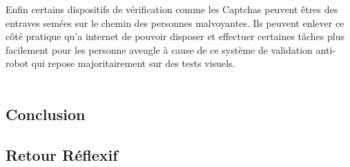 \documentclass{article}
\begin{document}
Enfin certains dispositifs de vérification comme les Captchas \cite{Wagner_2022b} peuvent êtres des entraves semées sur le chemin des personnes malvoyantes. Ils peuvent enlever ce côté pratique qu’a internet de pouvoir disposer et effectuer certaines tâches plus facilement pour les personne aveugle à cause de ce système de validation anti-robot qui repose majoritairement sur des tests visuels. \\\\

\subsection{Conclusion}

\subsection{Retour Réflexif}





\end{document}

